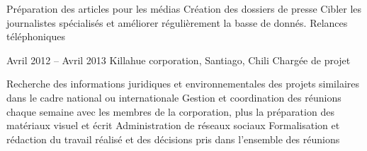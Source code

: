 \documentclass{tccv}
\begin{document}
\begin{textblock}{13}
\begin{mdframed}
\begin{eventlist}
\begin{itemize}
      \setlength\itemsep{0cm} 
      \cvitem[\checkmark] Préparation des articles pour les médias
      \cvitem[\checkmark] Création des dossiers de presse 
      \cvitem[\checkmark] Cibler les journalistes spécialisés et améliorer régulièrement la basse de donnés. 
      \cvitem[\checkmark] Relances téléphoniques
\end{itemize}       



\item{Avril 2012 -- Avril 2013 }     
  {Killahue corporation, Santiago, Chili}     
  {Chargée de projet}

\begin{itemize}
      \setlength\itemsep{0cm} 
      \cvitem[\checkmark] Recherche des informations juridiques et environnementales des projets similaires dans le cadre national ou internationale
      \cvitem[\checkmark] Gestion et coordination des réunions chaque semaine avec les membres de la corporation, plus la préparation des matériaux visuel et écrit
      \cvitem[\checkmark] Administration de réseaux sociaux 
      \cvitem[\checkmark] Formalisation et rédaction du travail réalisé et des décisions pris dans l’ensemble des réunions

\end{itemize}      
    

   


\end{eventlist}


\end{mdframed}
\end{textblock}
\end{document}
